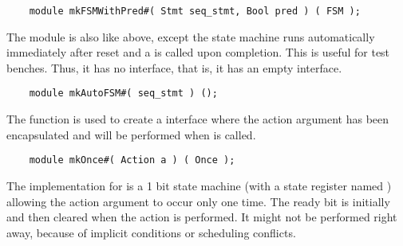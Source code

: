 \begin{verbatim}
    module mkFSMWithPred#( Stmt seq_stmt, Bool pred ) ( FSM );
\end{verbatim}

The  module is also like  above, except the
state machine runs automatically immediately after reset and a
 is called upon completion.  This is useful for test
benches. Thus, it has no interface, that is, it has an empty
interface.

\begin{verbatim}
    module mkAutoFSM#( seq_stmt ) ();
\end{verbatim}
The  function is used to create a  interface where
the action argument has been encapsulated and will be performed when
 is called.
\begin{verbatim}
    module mkOnce#( Action a ) ( Once );
\end{verbatim}
The implementation for  is a 1 bit state machine (with a
state register named ) allowing the
action argument to  occur only one time.  The ready bit is initially 
and then cleared when the action is performed. It might not be performed
right away, because of implicit conditions or scheduling conflicts.  



